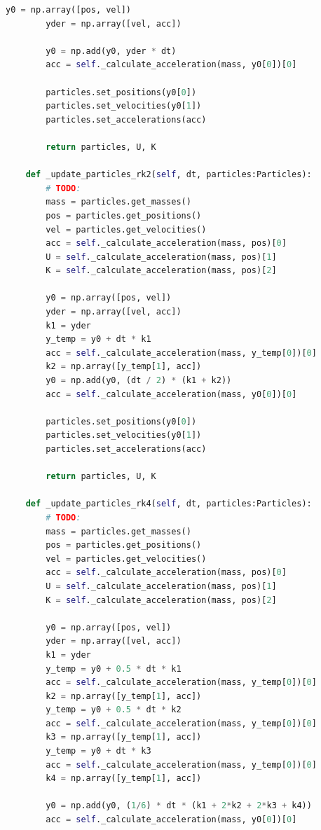 \documentclass[12pt]{article}
\begin{document}
\begin{lstlisting}[language={Python}]
        y0 = np.array([pos, vel])
        yder = np.array([vel, acc])
        
        y0 = np.add(y0, yder * dt)
        acc = self._calculate_acceleration(mass, y0[0])[0]
        
        particles.set_positions(y0[0])
        particles.set_velocities(y0[1])
        particles.set_accelerations(acc)
        
        return particles, U, K

    def _update_particles_rk2(self, dt, particles:Particles):
        # TODO:
        mass = particles.get_masses()
        pos = particles.get_positions()
        vel = particles.get_velocities()
        acc = self._calculate_acceleration(mass, pos)[0]
        U = self._calculate_acceleration(mass, pos)[1]
        K = self._calculate_acceleration(mass, pos)[2]
        
        y0 = np.array([pos, vel])
        yder = np.array([vel, acc])
        k1 = yder
        y_temp = y0 + dt * k1 
        acc = self._calculate_acceleration(mass, y_temp[0])[0]
        k2 = np.array([y_temp[1], acc])
        y0 = np.add(y0, (dt / 2) * (k1 + k2))
        acc = self._calculate_acceleration(mass, y0[0])[0]
        
        particles.set_positions(y0[0])
        particles.set_velocities(y0[1])
        particles.set_accelerations(acc)
        
        return particles, U, K

    def _update_particles_rk4(self, dt, particles:Particles):
        # TODO:
        mass = particles.get_masses()
        pos = particles.get_positions()
        vel = particles.get_velocities()
        acc = self._calculate_acceleration(mass, pos)[0]
        U = self._calculate_acceleration(mass, pos)[1]
        K = self._calculate_acceleration(mass, pos)[2]
        
        y0 = np.array([pos, vel])
        yder = np.array([vel, acc])
        k1 = yder
        y_temp = y0 + 0.5 * dt * k1 
        acc = self._calculate_acceleration(mass, y_temp[0])[0]
        k2 = np.array([y_temp[1], acc])
        y_temp = y0 + 0.5 * dt * k2
        acc = self._calculate_acceleration(mass, y_temp[0])[0]
        k3 = np.array([y_temp[1], acc])
        y_temp = y0 + dt * k3
        acc = self._calculate_acceleration(mass, y_temp[0])[0]
        k4 = np.array([y_temp[1], acc])
        
        y0 = np.add(y0, (1/6) * dt * (k1 + 2*k2 + 2*k3 + k4))
        acc = self._calculate_acceleration(mass, y0[0])[0]
        

\end{lstlisting}
\end{document}
